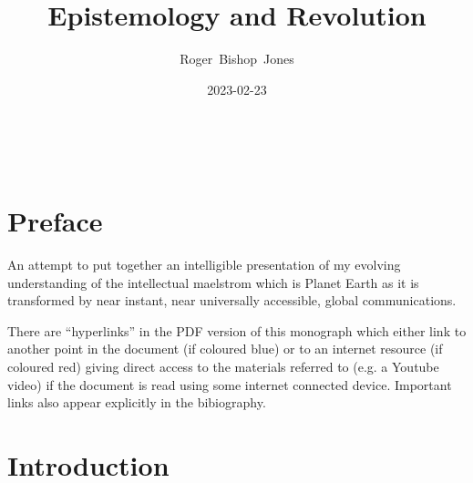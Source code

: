 \documentclass[10pt,titlepage]{article}
\title{\bf{\LARGE Epistemology and Revolution}}
\author{Roger~Bishop~Jones}
\date{\small 2023-02-23}
\newcommand{\ignore}[1]{}
\begin{document}
% 
                               
\begin{titlepage}
\maketitle





\end{titlepage}

\ \

\ignore{
\begin{centering}
{}
\end{centering}
}%

\setcounter{tocdepth}{2}
{\parskip-0pt\tableofcontents}


\pagebreak

\section*{Preface}


An attempt to put together an intelligible presentation of my evolving understanding of the intellectual maelstrom which is Planet Earth as it is transformed by near instant, near universally accessible, global communications.

There are ``hyperlinks'' in the PDF version of this monograph which either link to another point in the document  (if coloured blue) or to an internet resource  (if coloured red) giving direct access to the materials referred to (e.g. a Youtube video) if the document is read using some internet connected device.
Important links also appear explicitly in the bibiography.

\section{Introduction}
\end{document}
